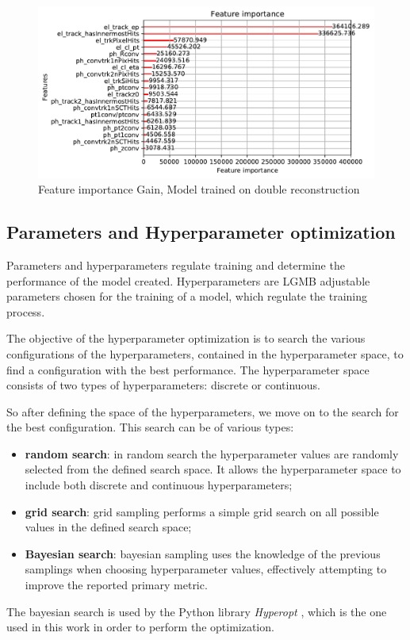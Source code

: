 \documentclass[a4paper, oneside, 11pt, openright]{book}
\begin{document}
\begin{itemize}
				\begin{figure}[H]
					\centering
					\includegraphics[width=.8\linewidth]{tesi_images/model_hyper_gain.pdf} 
					\caption{Feature importance Gain, Model trained on double reconstruction}
					\label{fig:gain} 
				\end{figure}
			\end{itemize}
			
			\subsection{Parameters and Hyperparameter optimization}\label{section:Hyper_param}
				Parameters and hyperparameters regulate training and determine the performance of the model created. Hyperparameters are LGMB \cite{LGBM} adjustable parameters chosen for the training of a model, which regulate the training process. 
				
				The objective of the hyperparameter optimization is to search the various configurations of the hyperparameters, contained in the hyperparameter space, to find a configuration with the best performance. The hyperparameter space consists of two types of hyperparameters: discrete or continuous.%
				
				So after defining the space of the hyperparameters, we move on to the search for the best configuration. This search can be of various types:
				\begin{itemize}
					\item \textbf{random search}: in random search the hyperparameter values are randomly selected from the defined search space. It allows the  hyperparameter space to include both discrete and continuous hyperparameters;
					\item \textbf{grid search}: grid sampling performs a simple grid search on all possible values in the defined search space;
					\item \textbf{Bayesian search}: bayesian sampling uses the knowledge of the previous samplings when choosing hyperparameter values, effectively attempting to improve the reported primary metric. %
				\end{itemize}
				The bayesian search is used by the Python library \textit{Hyperopt} \cite{Hyperopt}, which is the one used in this work in order to perform the optimization.
				
\end{document}
